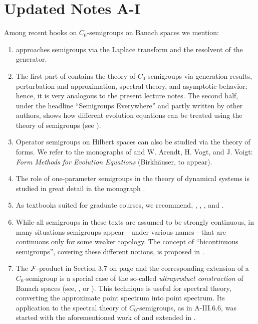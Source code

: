 \section{Updated Notes A-I}
Among recent books on $C_{0}$-semigroups on Banach spaces we mention:
\begin{enumerate}
\item 
{} approaches semigroups via the Laplace transform and the resolvent of the generator. 
\item 
The first part of  contains the theory of $C_{0}$-semigroups via generation results, perturbation and approximation, spectral theory, and asymptotic behavior; hence, it is very analogous to the present lecture notes. 
The second half, under the headline \enquote{Semigroups Everywhere} and partly written by other authors, shows how different evolution equations can be treated using the theory of semigroups (see ).
\item 
Operator semigroups on Hilbert spaces can also be studied via the theory of forms.
We refer to the monographs of  and W. Arendt, H. Vogt, and J. Voigt: \emph{Form Methods for Evolution Equations} (Birkhäuser, to appear).
\item
The role of one-parameter semigroups in the theory of dynamical systems is studied in great detail in the monograph .
\item
As textbooks suited for graduate courses, we recommend, \eg, 
, , and
.
\item
While all semigroups in these texts are assumed to be strongly continuous, in many situations semigroups appear---under various names---that are continuous only for some weaker topology. 
The concept of \enquote{bicontinuous semigroups}, covering these different notions, is proposed in . 
\item
The $\mathcal{F}$-product in Section 3.7 on page \pageref{subsec:a1-3.7} and the corresponding extension of a $C_{0}$-semigroup is a special case of the so-called \emph{ultraproduct construction} of Banach spaces (see, \eg,  or ).
This technique is useful for spectral theory, converting the approximate point spectrum into point spectrum. 
Its application to the spectral theory of $C_{0}$-semigroups, as in 
\mbox{A-III.6.6}, was started with the aforementioned work of  and extended in .
\end{enumerate}


